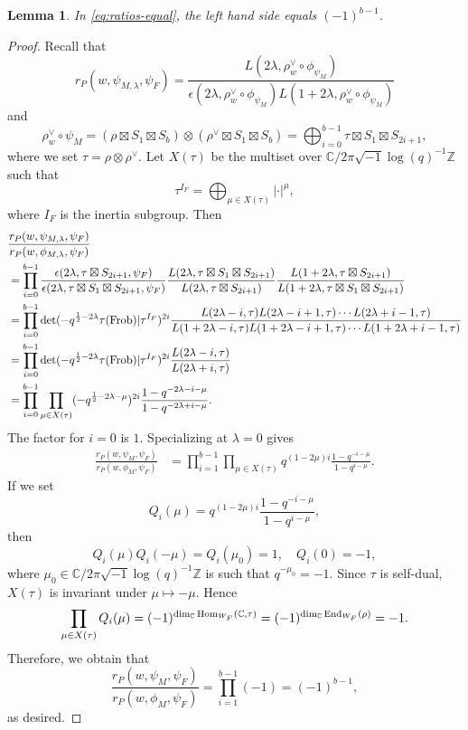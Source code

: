 \documentclass[11pt,reqno]{amsart}
\theoremstyle{plain}
\newtheorem{lem}[thm]{Lemma}
\theoremstyle{definition}
\newcommand{\Z}{\mathbb{Z}}
\newcommand{\C}{\mathbb{C}}
\newcommand{\Frob}{\tu{Frob}}
\newcommand{\Hom}{\tu{Hom}}
\newcommand{\End}{\tu{End}}
\newcommand{\tu}{\textup}
\numberwithin{equation}{subsection}
\begin{document}
\begin{lem}\label{lem:rP-ratio}
 In \eqref{eq:ratios-equal}, the left hand side equals $(-1)^{b-1}$.
\end{lem}

\begin{proof}
Recall that 
\[
r_P(w,\psi_{M,\lambda},\psi_F)=\frac{L(2\lambda,\rho^\vee_w\circ \phi_{\psi_{M}})}{\epsilon(2\lambda,\rho^\vee_w\circ \phi_{\psi_{M}})L(1+2\lambda,\rho^\vee_w\circ \phi_{\psi_{M}})}
\]
and
\[
\rho^\vee_w\circ \psi_{M}
= (\rho \boxtimes S_1 \boxtimes S_b)
\otimes (\rho^\vee \boxtimes S_1 \boxtimes S_b)
= \bigoplus_{i=0}^{b-1} \tau \boxtimes S_1 \boxtimes S_{2i+1},
\]
where we set $\tau = \rho \otimes \rho^\vee$.
Let $X(\tau)$ be the multiset over $\C/2\pi\sqrt{-1}\log(q)^{-1}\Z$ such that 
\[
\tau^{I_F} = \bigoplus_{\mu \in X(\tau)} |\cdot|^\mu, 
\]
where $I_F$ is the inertia subgroup.
Then 
\begin{align*}
&\frac{r_P(w,\psi_{M,\lambda},\psi_F)}{r_P(w,\phi_{M,\lambda},\psi_F)}   
\\&= \prod_{i=0}^{b-1} \frac{\epsilon(2\lambda, \tau \boxtimes S_{2i+1},\psi_F)}{\epsilon(2\lambda, \tau \boxtimes S_1 \boxtimes S_{2i+1},\psi_F)}
\frac{L(2\lambda, \tau \boxtimes S_1 \boxtimes S_{2i+1})}{L(2\lambda, \tau \boxtimes S_{2i+1})}
\frac{L(1+2\lambda, \tau \boxtimes S_{2i+1})}{L(1+2\lambda, \tau \boxtimes S_1 \boxtimes S_{2i+1})}
\\&=
\prod_{i=0}^{b-1} 
\det(-q^{\frac{1}{2}-2\lambda} \tau(\Frob)|\tau^{I_F})^{2i}
\frac{L(2\lambda-i,\tau)L(2\lambda-i+1,\tau) \cdots L(2\lambda+i-1,\tau)}
{L(1+2\lambda-i,\tau)L(1+2\lambda-i+1,\tau)\cdots L(1+2\lambda+i-1,\tau)}
\\&=
\prod_{i=0}^{b-1}  
\det(-q^{\frac{1}{2}-2\lambda} \tau(\Frob)|\tau^{I_F})^{2i}
\frac{L(2\lambda-i,\tau)}{L(2\lambda+i,\tau)}
\\&=
\prod_{i=0}^{b-1} 
\prod_{\mu \in X(\tau)}
(-q^{\frac{1}{2}-2\lambda-\mu})^{2i}
\frac{1-q^{-2\lambda-i-\mu}}{1-q^{-2\lambda+i-\mu}}.
\end{align*}
The factor for $i=0$ is $1$. Specializing at $\lambda=0$ gives
\begin{align*}
\frac{r_P(w,\psi_{M},\psi_F)}{r_P(w,\phi_{M},\psi_F)}   
&=
\prod_{i=1}^{b-1} 
\prod_{\mu \in X(\tau)}
q^{(1-2\mu)i}
\frac{1-q^{-i-\mu}}{1-q^{i-\mu}}.
\end{align*}
If we set 
\[
Q_i(\mu) = q^{(1-2\mu)i}
\frac{1-q^{-i-\mu}}{1-q^{i-\mu}}, 
\]
then 
\[
Q_i(\mu)Q_i(-\mu) = Q_i(\mu_0) = 1,
\quad Q_i(0) = -1, 
\]
where $\mu_0 \in \C/2\pi\sqrt{-1}\log (q)^{-1}\Z$ is such that $q^{-\mu_0} = -1$. 
Since $\tau$ is self-dual, $X(\tau)$ is invariant under $\mu \mapsto -\mu$. 
Hence 
\[
\prod_{\mu \in X(\tau)}Q_i(\mu) 
= (-1)^{\dim_\C \Hom_{W_F}(\C, \tau)} 
= (-1)^{\dim_\C \End_{W_F}(\rho)} 
= -1. 
\]
Therefore, we obtain that 
\[
\frac{r_P(w,\psi_{M},\psi_F)}{r_P(w,\phi_{M},\psi_F)} 
= \prod_{i=1}^{b-1}(-1) = (-1)^{b-1}, 
\]
as desired.
\end{proof}
\end{document}
